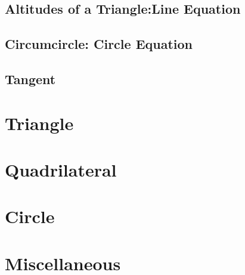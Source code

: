 \documentclass[11pt]{book}
\begin{document}
\section{Altitudes of a Triangle:Line Equation}

\section{Circumcircle: Circle Equation}

\section{Tangent}

\chapter{Triangle}

\chapter{Quadrilateral}

%
\chapter{Circle}

\chapter{Miscellaneous }

\iffalse
% 
\backmatter
\appendix
\chapter{Area of a Circle}

\fi
%
%

%
%
%
\latexprintindex
\end{document}

